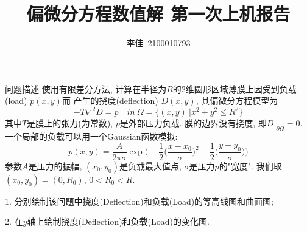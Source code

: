 \documentclass{article}
\title{偏微分方程数值解$\ \ $第一次上机报告}
\author{李佳~2100010793}
\date{}
\begin{document}
\maketitle
\begin{section}{问题描述}
    使用有限差分方法, 计算在半径为$R$的2维圆形区域薄膜上因受到负载(load) $p(x,y)$而
    产生的挠度(deflection) $D(x,y)$, 其偏微分方程模型为
    $$-T\nabla^2 D=p\quad in\ \Omega=\{(x,y)\ | x^2+y^2\leq R^2\}$$
    其中$T$是膜上的张力(为常数), $p$是外部压力负载. 膜的边界没有挠度, 即$D|_{\partial\Omega}=0$.
    一个局部的负载可以用一个Gaussian函数模拟:
    $$p(x,y)=\frac{A}{2\pi\sigma}\exp\bigg(-\frac{1}{2}\big(\frac{x-x_0}{\sigma}\big)^2-\frac{1}{2}\big(\frac{y-y_0}{\sigma}\big)\bigg)$$
    参数$A$是压力的振幅, $(x_0,y_0)$是负载最大值点, $\sigma$是压力$p$的"宽度". 我们取$(x_0,y_0)=(0,R_0)$, $0<R_0<R$.
    
    1. 分别绘制该问题中挠度(Deflection)和负载(Load)的等高线图和曲面图;

    2. 在$y$轴上绘制挠度(Deflection)和负载(Load)的变化图.
\end{section}
\end{document}

